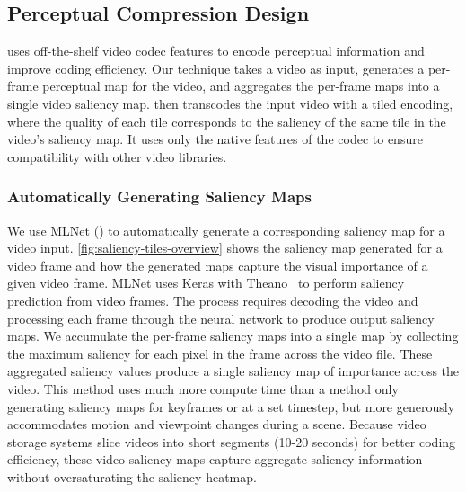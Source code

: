 \subsection{\name Perceptual Compression Design}
\label{sec:tiled-compression}

\nameCompress uses off-the-shelf video codec features to encode perceptual information and improve coding efficiency.
Our technique takes a video as input, generates a per-frame perceptual map for the video, and aggregates the per-frame maps into a single video saliency map.
\nameCompress then transcodes the input video with a tiled encoding, where the quality of each tile corresponds to the saliency of the same tile in the video's saliency map.
It uses only the native features of the \hevc codec to ensure compatibility with other video libraries.

\subsubsection{Automatically Generating Saliency Maps}
\label{subsec:supersal}

We use MLNet (\cite{mlnet2016}) to automatically generate a corresponding saliency map for a video input.
\ref{fig:saliency-tiles-overview} shows the saliency map generated for a video frame and how the generated maps capture the visual importance of a given video frame.
MLNet uses Keras with Theano~\cite{chollet2015keras, theano} to perform saliency prediction from video frames.
The process requires decoding the video and processing each frame through the neural network to produce output saliency maps.
We accumulate the per-frame saliency maps into a single map by collecting the maximum saliency for each pixel in the frame across the video file.
These aggregated saliency values produce a single saliency map of importance across the video.
This method uses much more compute time than a method only generating saliency maps for keyframes or at a set timestep, but more generously accommodates motion and viewpoint changes during a scene.
Because video storage systems slice videos into short segments (10-20 seconds) for better coding efficiency, these video saliency maps capture aggregate saliency information without oversaturating the saliency heatmap.

